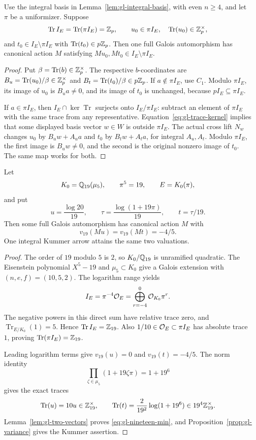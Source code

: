 \begin{lemma}\label{lem:gl-two-vectors}
Use the integral basis in
Lemma~\ref{lem:gl-integral-basis}, with even $n\ge4$, and let $\pi$ be
a uniformizer. Suppose
\[
 \operatorname{Tr}I_E=\operatorname{Tr}(\pi I_E)=\mathbb Z_p,
 \qquad u_0\in\pi I_E,\quad
 \operatorname{Tr}(u_0)\in\mathbb Z_p^\times,
\]
and $t_0\in I_E\setminus\pi I_E$ with
$\operatorname{Tr}(t_0)\in p\mathbb Z_p$. Then one full Galois
automorphism has canonical action $M$ satisfying
$Mu_0,Mt_0\in I_E\setminus\pi I_E$.
\end{lemma}
\begin{proof}
Put $\beta=\operatorname{Tr}(b)\in\mathbb Z_p^\times$. The respective
$b$-coordinates are $B_u=\operatorname{Tr}(u_0)/\beta\in\mathbb Z_p^\times$
and $B_t=\operatorname{Tr}(t_0)/\beta\in p\mathbb Z_p$.
If $a\notin\pi I_E$, use $C_1$. Modulo $\pi I_E$, its image of
$u_0$ is $B_ua\ne0$, and its image of $t_0$ is unchanged, because
$pI_E\subseteq\pi I_E$.

If $a\in\pi I_E$, then $I_E\cap\ker\operatorname{Tr}$ surjects
onto $I_E/\pi I_E$: subtract an element of $\pi I_E$ with the same
trace from any representative. Equation~\eqref{eq:gl-trace-kernel}
implies that some displayed basis vector $w\in W$ is outside
$\pi I_E$. The actual cross lift $N_w$ changes $u_0$ by
$B_uw+A_ua$ and $t_0$ by $B_tw+A_ta$, for integral $A_u,A_t$.
Modulo $\pi I_E$, the first image is $B_uw\ne0$, and the second
is the original nonzero image of $t_0$. The same map works for both.
\end{proof}

\begin{theorem}
\label{thm:gl-nineteen}
Let
\[
 K_0=\mathbb Q_{19}(\mu_5),\qquad \pi^5=19,\qquad E=K_0(\pi),
\]
and put
\[
 u=\frac{\log20}{19},\qquad
 \tau=\frac{\log(1+19\pi)}{19},\qquad t=\tau/19.
\]
Then some full Galois automorphism has canonical action $M$ with
\begin{equation}\label{eq:gl-nineteen-min}
 v_{19}(Mu)=v_{19}(Mt)=-4/5.
\end{equation}
One integral Kummer arrow attains the same two valuations.
\end{theorem}
\begin{proof}
The order of $19$ modulo $5$ is $2$, so $K_0/\mathbb Q_{19}$ is
unramified quadratic. The Eisenstein polynomial $X^5-19$ and
$\mu_5\subset K_0$ give a Galois extension with $(n,e,f)=(10,5,2)$.
The logarithm range yields
\[
 I_E=\pi^{-4}\mathcal O_E
     =\bigoplus_{r=-4}^{0}\mathcal O_{K_0}\pi^r.
\]
The negative powers in this direct sum have relative trace zero,
and $\operatorname{Tr}_{E/K_0}(1)=5$. Hence
$\operatorname{Tr}I_E=\mathbb Z_{19}$. Also
$1/10\in\mathcal O_E\subset\pi I_E$ has absolute trace $1$, proving
$\operatorname{Tr}(\pi I_E)=\mathbb Z_{19}$.

Leading logarithm terms give
$v_{19}(u)=0$ and $v_{19}(t)=-4/5$. The norm identity
\[
 \prod_{\zeta\in\mu_5}(1+19\zeta\pi)=1+19^6
\]
gives the exact traces
\[
 \operatorname{Tr}(u)=10u\in\mathbb Z_{19}^\times,
 \qquad \operatorname{Tr}(t)=\frac2{19^2}\log(1+19^6)
                         \in19^4\mathbb Z_{19}^\times.
\]
Lemma~\ref{lem:gl-two-vectors} proves \eqref{eq:gl-nineteen-min},
and Proposition~\ref{prop:gl-variance} gives the Kummer assertion.
\end{proof}


